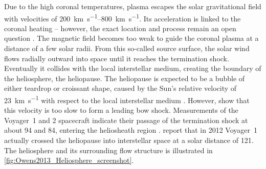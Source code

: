 Due to the high coronal temperatures, plasma escapes the solar gravitational field \citep{Parker1958} with velocities of \SIrange{200}{800}{\km\per\s}. Its acceleration is linked to the coronal heating -- however, the exact location and process remain an open question \citep{Hollweg1985,McComas2007,Fox2015,Cranmer2017}. The magnetic field becomes too weak to guide the coronal plasma at a distance of a few solar radii. From this so-called source surface, the solar wind flows radially outward into space until it reaches the termination shock. Eventually it collides with the local interstellar medium, creating the boundary of the heliosphere, the heliopause. The heliopause is expected to be a bubble of either teardrop or croissant shape, caused by the Sun's relative velocity of \SI{23}{\km\per\s} with respect to the local interstellar medium \citep{Owens2013, Opher2015}. However, \citet{McComas2012} show that this velocity is too slow to form a leading bow shock. Measurements of the Voyager~1 and 2 spacecraft indicate their passage of the termination shock at about \SI{94}{\au} and \SI{84}{\au}, entering the heliosheath region \citep{Owens2013}. \citet{Gurnett2013} report that in 2012 Voyager~1 actually crossed the heliopause into interstellar space at a solar distance of \SI{121}{\au}. The heliosphere and its surrounding flow structure is illustrated in \autoref{fig:Owens2013_Heliosphere_screenshot}.
